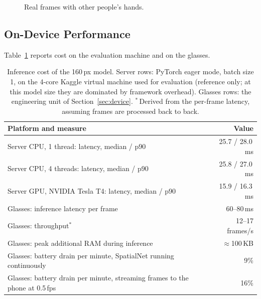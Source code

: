 \begin{figure}[t]
  \centering
  \caption{Real frames with other people's hands. }
  \label{fig:own-real}
\end{figure}

\subsection{On-Device Performance}\label{sec:ondevice}

Table~\ref{tab:device} reports cost on the evaluation machine and on the glasses.


\begin{table}[t]
  \caption{Inference cost of the 160\,px model. Server rows: PyTorch eager mode, batch size 1, on the 4-core Kaggle virtual machine used for evaluation (reference only; at this model size they are dominated by framework overhead). Glasses rows: the engineering unit of Section~\ref{sec:device}. $^\ast$\,Derived from the per-frame latency, assuming frames are processed back to back.}
  \label{tab:device}
  \footnotesize
  \begin{tabular}{lr}
    \toprule
    Platform and measure & Value \\
    \midrule
    Server CPU, 1 thread: latency, median / p90 & 25.7 / 28.0\,ms \\
    Server CPU, 4 threads: latency, median / p90 & 25.8 / 27.0\,ms \\
    Server GPU, NVIDIA Tesla T4: latency, median / p90 & 15.9 / 16.3\,ms \\
    \midrule
    Glasses: inference latency per frame & 60--80\,ms \\
    Glasses: throughput$^\ast$ & 12--17 frames/s \\
    Glasses: peak additional RAM during inference & ${\approx}$100\,KB \\
    Glasses: battery drain per minute, SpatialNet running continuously & 9\% \\
    Glasses: battery drain per minute, streaming frames to the phone at 0.5\,fps & 16\% \\
    \bottomrule
  \end{tabular}
\end{table}

